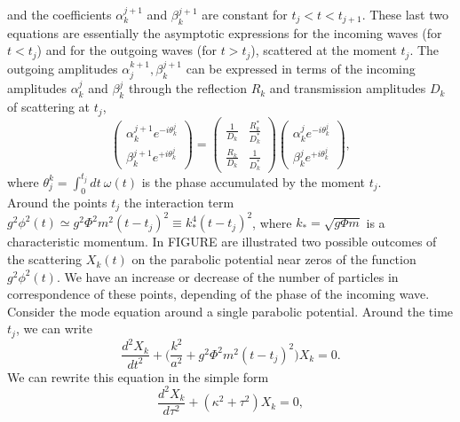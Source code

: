 \documentclass[11pt,a4paper,twoside]{book}
\begin{document}
and the coefficients $ \alpha_{k}^{j+1} $ and $ \beta_{k}^{j+1} $ are constant for $ t_{j}<t<t_{j+1} $. These last two equations are essentially the asymptotic expressions for the incoming waves (for $ t < t_{j} $) and for the outgoing waves (for $ t > t_{j} $), scattered at the moment $ t_{j} $. The outgoing amplitudes $ \alpha_{j}^{k+1}, \beta_{k}^{j+1} $ can be expressed in terms of the incoming amplitudes $ \alpha_{k}^{j} $ and $ \beta_{k}^{j} $ through the reflection $ R_{k} $ and transmission amplitudes $ D_{k} $ of scattering at $ t_{j} $,
\begin{equation}
	\label{Chap4:ScatteringMatrices}
		\left(
		\begin{array}{c}
			\alpha_{k}^{j+1}e^{-i\theta_{k}^{j}} \\
			\beta_{k}^{j+1}e^{+i\theta_{k}^{j}}
		\end{array}
		\right)
		=
		\left(
		\begin{array}{cc}
			\frac{1}{D_{k}}  & \frac{R_{k}^{*}}{D_{k}^{*}} \\
			\frac{R_{k}}{D_{k}} & \frac{1}{D^{*}_{k}}
		\end{array}
		\right)
		\left(
		\begin{array}{c}
		\alpha_{k}^{j}e^{-i\theta_{k}^{j}}	\\
			\beta_{k}^{j}e^{+i\theta_{k}^{j}}
		\end{array}
		\right),
	\end{equation}
where $ \theta_{j}^{k}=\int_{0}^{t_{j}} dt\ \omega(t)$ is the phase accumulated by the moment $ t_{j} $.\\
Around the points $ t_{j} $ the interaction term $ g^{2}\phi^{2}(t) \simeq g^{2}\Phi^{2}m^{2}(t-t_{j})^{2} \equiv k_{*}^{4}(t-t_{j})^{2} $, where $ k_{*}=\sqrt{g\Phi m} $ is a characteristic momentum. In FIGURE are illustrated two possible outcomes of the scattering $ X_{k}(t) $ on the parabolic potential near zeros of the function $ g^{2}\phi^{2}(t) $. We have an increase or decrease of the number of particles in correspondence of these points, depending of the phase of the incoming wave.\\
Consider the mode equation around a single parabolic potential. Around the time $ t_{j} $, we can write
\begin{equation}
	\label{Chap4:EquationXkAroundtj}
	\frac{d^{2}X_{k}}{dt^{2}} + \Bigg(\frac{k^{2}}{a^{2}} + g^{2}\Phi^{2}m^{2}(t-t_{j})^{2}\Bigg)X_{k}=0.
\end{equation}
We can rewrite this equation in the simple form 
\begin{equation}
	\label{Chap4:EquationXkAround2}
	\frac{d^{2}X_{k}}{d\tau^{2}} + (\kappa^{2} + \tau^{2})X_{k}=0,
\end{equation}
\end{document}

